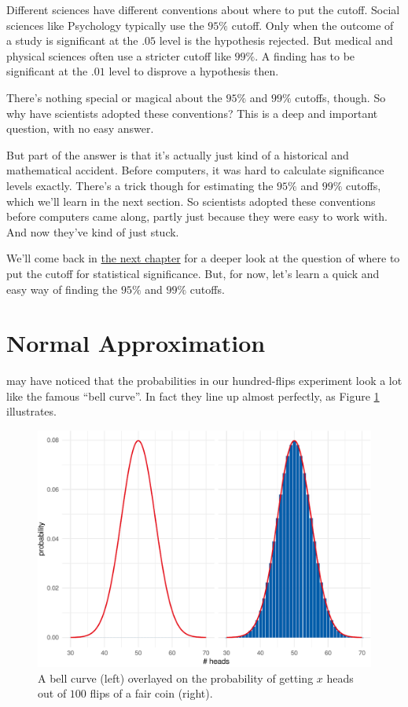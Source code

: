 \documentclass[justified]{tufte-book}
\theoremstyle{definition}
\theoremstyle{definition}
\theoremstyle{definition}
\theoremstyle{remark}
\begin{document}
Different sciences have different conventions about where to put the cutoff. Social sciences like Psychology typically use the \(95\%\) cutoff. Only when the outcome of a study is significant at the \(.05\) level is the hypothesis rejected. But medical and physical sciences often use a stricter cutoff like \(99\%\). A finding has to be significant at the \(.01\) level to disprove a hypothesis then.

There's nothing special or magical about the \(95\%\) and \(99\%\) cutoffs, though. So why have scientists adopted these conventions? This is a deep and important question, with no easy answer.

But part of the answer is that it's actually just kind of a historical and mathematical accident. Before computers, it was hard to calculate significance levels exactly. There's a trick though for estimating the \(95\%\) and \(99\%\) cutoffs, which we'll learn in the next section. So scientists adopted these conventions before computers came along, partly just because they were easy to work with. And now they've kind of just stuck.

We'll come back in \protect\hyperlink{chlindley}{the next chapter} for a deeper look at the question of where to put the cutoff for statistical significance. But, for now, let's learn a quick and easy way of finding the \(95\%\) and \(99\%\) cutoffs.

\hypertarget{normal-approximation}{%
\section{Normal Approximation}\label{normal-approximation}}

 may have noticed that the probabilities in our hundred-flips experiment look a lot like the famous ``bell curve''. In fact they line up almost perfectly, as Figure \ref{fig:napprox} illustrates.

\begin{figure}
\includegraphics{_main_files/figure-latex/napprox-1} \caption[A bell curve (left) overlayed on the probability of getting $x$ heads out of $100$ flips of a fair coin (right)]{A bell curve (left) overlayed on the probability of getting $x$ heads out of $100$ flips of a fair coin (right).}\label{fig:napprox}
\end{figure}
\end{document}
